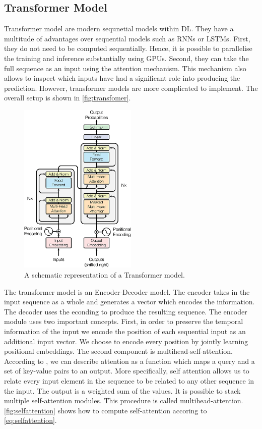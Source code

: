\documentclass[./../../paper.tex]{subfiles}
\begin{document}
\subsection{Transformer Model}
Transformer model are modern sequnetial models within \gls{DL}. They have a multitude of advantages over sequential models such as \glspl{RNN} or \glspl{LSTM}\needscite{}. First, they do not need to be computed sequentially. Hence, it is possible to parallelise the training and inference substantially using GPUs. Second, they can take the full sequence as an input using the attention mechanism. This mechanism also allows to inspect which inputs have had a significant role into producing the prediction. However, transformer models are more complicated to implement. The overall setup is shown in \autoref{fig:transfomer}\autocite{vaswani_AttentionAllYou_2017}.

\begin{figure}[htb]
    \centering
    \includegraphics[width=0.5\textwidth]{figures/transformer.png}
    \caption{A schematic representation of a Transformer model.}
    \label{fig:transformer}
\end{figure}

The transformer model is an Encoder-Decoder model. The encoder takes in the input sequence as a whole and generates a vector which encodes the information. The decoder uses the econding to produce the resulting sequence. The encoder module uses two important concepts. First, in order to preserve the temporal information of the input we encode the position of each sequential input as an additional input vector. We choose to encode every position by jointly learning  positional embeddings. The second component is multihead-self-attention. According to \citeauthor{vaswani_AttentionAllYou_2017}, we can describe attention as a function which maps a query and a set of key-value pairs to an output. More specifically, self attention allows us to relate every input element in the sequence to be related to any other sequence in the input. The output is a weighted sum of the values. It is possible to stack multiple self-attention modules. This procedure is called multihead-attention. \autoref{fig:selfattention} shows how to compute self-attention accoring to \autoref{eq:selfattention}\autocite{vaswani_AttentionAllYou_2017}. 
\end{document}
